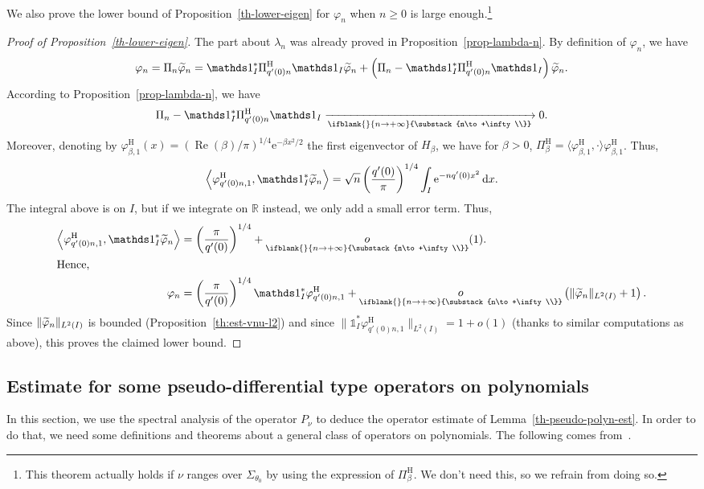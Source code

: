 \documentclass[10pt]{amsart}
\theoremstyle{definition}\newtheorem{defi}[theo]{Definition}\newtheorem{rema}[theo]{Remark}\newtheorem{exam}[theo]{Example}\newtheorem{exem}[theo]{Example}\newtheorem{nota}[theo]{Notation}
\renewcommand{\geq}{\geqslant}
\newcommand{\littleo}[3][]{\mathop{o}\limits_{\ifblank{#1}{#2 \to #3}{\substack{#2\to #3\\#1}}}}
\newcommand{\1}{\mathds 1}
\newcommand{\limt}[3][]{\xrightarrow[\ifblank{#1}{#2 \to #3}{\substack{#2\to #3\\#1}}]{}}
\DeclareMathOperator{\Ree}{Re}
\newcommand{\R}{\mathbb{R}}
\newcommand{\diff}[1][-3]{\ensuremath{\mathop{}\mkern#1mu\mathrm{d}}}
\newcommand{\eu}{\mathrm e}
\newcommand{\sector}[1][\theta_0]{\Sigma_{#1}}
\newcommand{\h}{{\mathrm{H}}}
\renewcommand{\b}{\beta}
\renewcommand{\l}{\lambda}
\newcommand{\f}{\varphi}
\let\oldtilde\tilde
\renewcommand*{\tilde}[1]{\mathchoice{\widetilde{#1}}{\widetilde{#1}}{\oldtilde{#1}}{\oldtilde{#1}}}
\begin{document}
We also prove the lower bound of Proposition~\ref{th-lower-eigen} for $\f_n$ when $n\geq 0$ is large enough.\footnote{This theorem actually holds if $\nu$ ranges over $\sector$ by using the expression of $\Pi_\b^\h$. We don't need this, so we refrain from doing so.}

\begin{proof}[Proof of Proposition~\ref{th-lower-eigen}]
The part about $\l_n$ was already proved in Proposition~\ref{prop-lambda-n}. By definition of $\f_n$, we have
\[
\f_n = \Pi_n \tilde \f_n = \1_I^*\Pi^\h_{q'(0)n} \1_I \tilde \f_n + \left(\Pi_n - \1_I^*\Pi^\h_{q'(0)n}\1_I\right)\tilde \f_n.
\]
According to Proposition~\ref{prop-lambda-n}, we have
\[
\Pi_n - \1_I^*\Pi^\h_{q'(0)n}\1_I \limt{n}{+\infty} 0.
\]
Moreover, denoting by $\f_{\b,1}^\h(x) = (\Ree(\b)/\pi)^{1/4}\eu^{-\b x^2\!/2}$ the first eigenvector of $H_\b$, we have for $\b>0$, $\Pi_\b^\h = \langle \f_{\b,1}^\h,\cdot\rangle \f_{\b,1}^\h$. Thus,
\[
\left\langle \f_{q'(0)n,1}^\h, \1^*_I \tilde \f_n\right\rangle = \sqrt n \left(\frac{q'(0)}{\pi}\right)^{1/4} \int_I \eu^{- nq'(0)x^2} \diff x.
\]
The integral above is on $I$, but if we integrate on $\R$ instead, we only add a small error term. Thus,
\begin{align*}
\left\langle \f_{q'(0)n,1}^\h, \1^*_I \tilde \f_n\right\rangle &= \left(\frac\pi{q'(0)}\right)^{1/4} + \littleo{n}{+\infty}(1).
\\
\intertext{Hence,}
\f_n &= \left(\frac{\pi}{q'(0)}\right)^{1/4}\1_I^*\f_{q'(0)n,1}^\h + \littleo{n}{+\infty}\left(\|\tilde \f_n\|_{L^2(I)} +1\right).
\end{align*}
Since $\|\tilde \f_n\|_{L^2(I)}$ is bounded (Proposition~\ref{th:est-vnu-l2}) and since $\|\1_I^* \f_{q'(0)n,1}^\h\|_{L^2(I)} = 1 + o(1)$ (thanks to similar computations as above), this proves the claimed lower bound.
\end{proof}

\subsection{Estimate for some pseudo-differential type operators on polynomials}\label{sec-pseudo-polyn-est}


In this section, we use the spectral analysis of the operator $P_\nu$ to deduce the operator estimate of Lemma~\ref{th-pseudo-polyn-est}. In order to do that, we need some definitions and theorems about a general class of operators on polynomials. The following comes from~\cite[Definition~9 \& Theorem~18]{Koenig17}.
\end{document}
